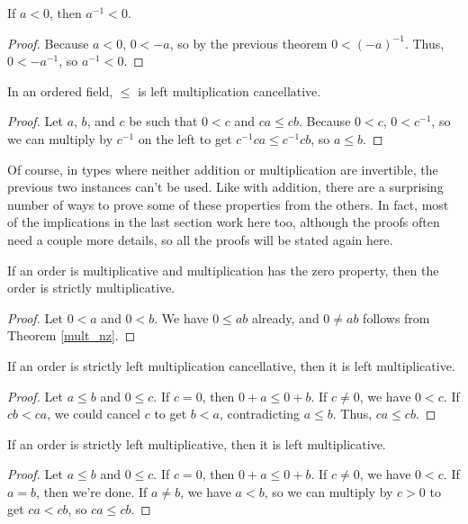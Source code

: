 \documentclass[../../math.tex]{subfiles}
\begin{document}
\begin{theorem}
    If $a < 0$, then $a^{-1} < 0$.
\end{theorem}
\begin{proof}
    Because $a < 0$, $0 < -a$, so by the previous theorem $0 < (-a)^{-1}$.
    Thus, $0 < -a^{-1}$, so $a^{-1} < 0$.
\end{proof}

\begin{instance}
    In an ordered field, $\leq$ is left multiplication cancellative.
\end{instance}
\begin{proof}
    Let $a$, $b$, and $c$ be such that $0 < c$ and $ca \leq cb$.  Because $0 <
    c$, $0 < c^{-1}$, so we can multiply by $c^{-1}$ on the left to get
    $c^{-1}ca \leq c^{-1}cb$, so $a \leq b$.
\end{proof}

Of course, in types where neither addition or multiplication are invertible, the
previous two instances can't be used.  Like with addition, there are a
surprising number of ways to prove some of these properties from the others.  In
fact, most of the implications in the last section work here too, although the
proofs often need a couple more details, so all the proofs will be stated again
here.

\begin{instance} \label{le_lt_mult}
    If an order is multiplicative and multiplication has the zero property, then
    the order is strictly multiplicative.
\end{instance}
\begin{proof}
    Let $0 < a$ and $0 < b$.  We have $0 \leq ab$ already, and $0 \neq ab$
    follows from Theorem \ref{mult_nz}.
\end{proof}

\begin{instance} \label{le_lmult1}
    If an order is strictly left multiplication cancellative, then it is left
    multiplicative.
\end{instance}
\begin{proof}
    Let $a \leq b$ and $0 \leq c$.  If $c = 0$, then $0 + a \leq 0 + b$.  If $c
    \neq 0$, we have $0 < c$.  If $cb < ca$, we could cancel $c$ to get $b < a$,
    contradicting $a \leq b$.  Thus, $ca \leq cb$.
\end{proof}

\begin{instance} \label{le_lmult2}
    If an order is strictly left multiplicative, then it is left multiplicative.
\end{instance}
\begin{proof}
    Let $a \leq b$ and $0 \leq c$.  If $c = 0$, then $0 + a \leq 0 + b$.  If $c
    \neq 0$, we have $0 < c$.  If $a = b$, then we're done.  If $a \neq b$, we
    have $a < b$, so we can multiply by $c > 0$ to get $ca < cb$, so $ca \leq
    cb$.
\end{proof}
\end{document}
